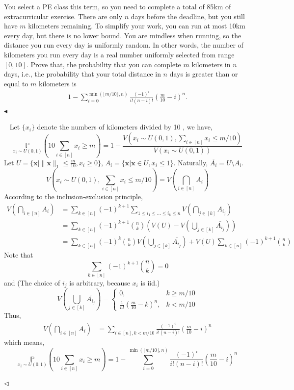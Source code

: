 \documentclass[11pt]{article}
\newenvironment{problem}[2][Problem]{\begin{trivlist}
\item[\hskip \labelsep {\bfseries #1}\hskip \labelsep {\bfseries #2.}]}{\hfill$\blacktriangleleft$\end{trivlist}}
\newenvironment{answer}[1][Answer]{\begin{trivlist}
\item[\hskip \labelsep {\bfseries #1.}\hskip \labelsep]}{\hfill$\lhd$\end{trivlist}}
\begin{document}
\begin{problem}{2 (16')}
You select a PE class this term, so you need to complete a total of 85km of extracurricular exercise. There are only $n$ days before the deadline, but you still have $m$ kilometers remaining. To simplify your work, you can run at most 10km every day, but there is no lower bound. You are mindless when running, so the distance you run every day is uniformly random. In other words, the number of kilometers you run every day is a real number uniformly selected from range $[0,10]$. Prove that, the probability that you can complete $m$ kilometers in $n$ days, i.e., the probability that your total distance in $n$ days is greater than or equal to $m$ kilometers is 
\begin{align*}
    1-\sum_{i=0}^{\min(\lfloor m/10\rfloor,n)}\frac{(-1)^i}{i!(n-i)!}\left(\frac{m}{10}-i\right)^n.
\end{align*}
\end{problem}
\begin{answer} ~
Let $\{x_i\}$ denote the numbers of kilometers divided by 10 , we have,
$$\underset{x_i\sim U(0,1)}{\mathbb P} (10\sum_{i\in [n]} x_i \ge m)=1-\frac{V(x_i\sim U(0,1),\sum_{i\in [n]} x_i \leq m/10)}{V(x_i\sim U(0,1))}$$ 
Let $U= \{\boldsymbol x|\|\boldsymbol{x}\|_1\leq \frac{m}{10},x_i\ge 0\}$, $A_i=\{\boldsymbol x|\boldsymbol{x}\in U, x_i\leq 1\}$. Naturally, $\overline{A_i}=U\setminus A_i$.
$$V(x_i\sim U(0,1),\sum_{i\in [n]} x_i \leq m/10)=V\left(\bigcap_{i\in [n]}A_i\right)$$
According to the inclusion-exclusion principle,
$$\begin{align*}V\left(\bigcap_{i\in [n]}A_i\right)&=\sum_{k\in [n]}(-1)^{k+1}\sum_{1\leq i_1\leq ...\leq i_k\leq n}V\left(\bigcap_{j\in [k]}A_{i_j}\right)\\&=\sum_{k\in [n]}(-1)^{k+1}\binom{n}{k}\left(V(U)-V\left(\bigcup_{j\in [k]}\overline{A_{i_j}}\right)\right)\\&=\sum_{k\in [n]}(-1)^{k}\binom{n}{k}V\left(\bigcup_{j\in [k]}\overline{A_{i_j}}\right)+V(U)\sum_{k\in [n]}(-1)^{k+1}\binom{n}{k}\end{align*}$$
Note that
$$\sum_{k\in [n]}(-1)^{k+1}\binom{n}{k}=0$$ 
and (The choice of $i_j$ is arbitrary, because $x_i$ is iid.)
$$ V\left(\bigcup_{j\in [k]}\overline{A_{i_j}}\right)=\begin{cases}0,\quad &k\ge m/10\\ \frac{1}{n!}\left(\frac{m}{10}-k\right)^n, &k<m/10\end{cases}$$
Thus, 
$$\begin{align*}V\left(\bigcap_{i\in [n]}A_i\right)&=\sum_{i\in [n] , k<m/10}\frac{(-1)^i}{i!(n-i)!}\left(\frac{m}{10}-i\right)^n\end{align*}$$
which means,
$$\underset{x_i\sim U(0,1)}{\mathbb P} (10\sum_{i\in [n]} x_i \ge m)=1-\sum_{i=0}^{\min(\lfloor m/10\rfloor,n)}\frac{(-1)^i}{i!(n-i)!}\left(\frac{m}{10}-i\right)^n$$

\end{answer}
\end{document}
